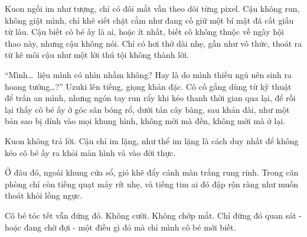 \documentclass[../main.tex]{subfiles}
\begin{document}
Kuon ngồi im như tượng, chỉ có đôi mắt vẫn theo dõi từng pixel. Cậu không run, không giật mình, chỉ khẽ siết chặt cằm như đang cố giữ một bí mật đã cất giấu từ lâu. Cậu biết cô bé ấy là ai, hoặc ít nhất, biết cô không thuộc về ngày hội thao này, nhưng cậu không nói. Chỉ có hơi thở dài nhẹ, gần như vô thức, thoát ra từ kẽ môi cậu như một lời thú tội không thành lời.

``Mình\dots\ liệu mình có nhìn nhầm không? Hay là do mình thiếu ngủ nên sinh ra hoang tưởng\dots?'' Uzuki lên tiếng, giọng khản đặc. Cô cố gắng dùng từ kỹ thuật để trấn an mình, nhưng ngón tay run rẩy khi kéo thanh thời gian qua lại, để rồi lại thấy cô bé ấy ở góc sân bóng rổ, dưới tán cây bàng, sau khán đài, như một bản sao bị dính vào mọi khung hình, không mời mà đến, không mời mà ở lại.

Kuon không trả lời. Cậu chỉ im lặng, như thể im lặng là cách duy nhất để không kéo cô bé ấy ra khỏi màn hình và vào đời thực.

Ở đâu đó, ngoài khung cửa sổ, gió khẽ đẩy cánh màn trắng rung rinh. Trong căn phòng chỉ còn tiếng quạt máy rít nhẹ, và tiếng tim ai đó đập rộn ràng như muốn thoát khỏi lồng ngực.

Cô bé tóc tết vẫn đứng đó.
Không cười.
Không chớp mắt.
Chỉ đứng đó quan sát - hoặc đang chờ đợi - một điều gì đó mà chỉ mình cô bé mới biết.
\end{document}

